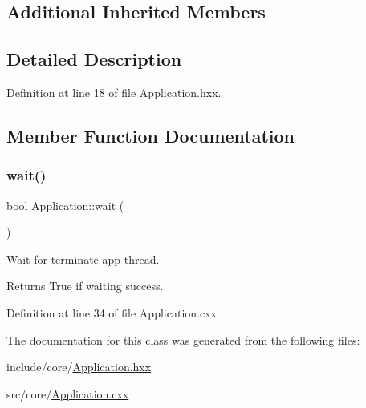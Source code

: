 \subsection*{Additional Inherited Members}


\subsection{Detailed Description}


Definition at line 18 of file Application.\+hxx.



\subsection{Member Function Documentation}
\mbox{\label{classeven_1_1_application_abcd00f11978265d2dcd3dfb962c671dc}} 
\subsubsection{\texorpdfstring{wait()}{wait()}}
{\footnotesize\ttfamily bool Application\+::wait (\begin{DoxyParamCaption}{ }\end{DoxyParamCaption})}



Wait for terminate app thread. 

\begin{DoxyReturn}{Returns}
True if waiting success. 
\end{DoxyReturn}


Definition at line 34 of file Application.\+cxx.



The documentation for this class was generated from the following files\+:\begin{DoxyCompactItemize}
\item 
include/core/\mbox{\hyperlink{_application_8hxx}{Application.\+hxx}}\item 
src/core/\mbox{\hyperlink{_application_8cxx}{Application.\+cxx}}\end{DoxyCompactItemize}
